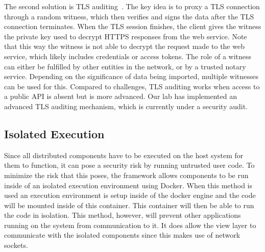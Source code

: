 The second solution is TLS auditing~\cite{tlsnotary2014whitepaper}.
The key idea is to proxy a TLS connection through a random witness, which then verifies and signs the data after the TLS connection terminates.
When the TLS session finishes, the client gives the witness the private key used to decrypt HTTPS responses from the web service.
Note that this way the witness is not able to decrypt the request made to the web service, which likely includes credentials or access tokens.
The role of a witness can either be fulfilled by other entities in the network, or by a trusted notary service.
Depending on the significance of data being imported, multiple witnesses can be used for this.
Compared to challenges, TLS auditing works when access to a public API is absent but is more advanced.
Our lab has implemented an advanced TLS auditing mechanism, which is currently under a security audit.

\subsection{Isolated Execution}

Since all distributed components have to be executed on the host system for them to function, it can pose a security risk by running untrusted user code. To minimize the risk that this poses, the framework allows components to be run inside of an isolated execution environment using Docker. When this method is used an execution environment is setup inside of the docker engine and the code will be mounted inside of this container. This container will then be able to run the code in isolation. This method, however, will prevent other applications running on the system from communication to it. It does allow the view layer to communicate with the isolated components since this makes use of network sockets.










